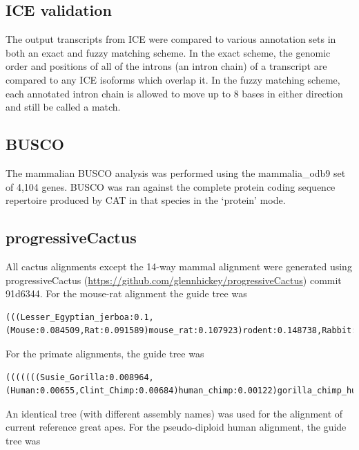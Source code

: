 \documentclass[fleqn,10pt]{wlscirep}
\begin{document}
\subsection*{ICE validation}
The output transcripts from ICE were compared to various annotation sets in both an exact and fuzzy matching scheme. In the exact scheme, the genomic order and positions of all of the introns (an intron chain) of a transcript are compared to any ICE isoforms which overlap it. In the fuzzy matching scheme, each annotated intron chain is allowed to move up to 8 bases in either direction and still be called a match.

\subsection*{BUSCO}
The mammalian BUSCO analysis was performed using the mammalia\_odb9 set of 4,104 genes. BUSCO was ran against the complete protein coding sequence repertoire produced by CAT in that species in the `protein' mode.

\subsection*{progressiveCactus}
	All cactus alignments except the 14-way mammal alignment were generated using progressiveCactus (\url{https://github.com/glennhickey/progressiveCactus}) commit 91d6344. For the mouse-rat alignment the guide tree was 

\begin{lstlisting}
(((Lesser_Egyptian_jerboa:0.1,(Mouse:0.084509,Rat:0.091589)mouse_rat:0.107923)rodent:0.148738,Rabbit:0.21569)glires:0.015313,Human:0.143908);
\end{lstlisting}
    
For the primate alignments, the guide tree was 
    
\begin{lstlisting}
(((((((Susie_Gorilla:0.008964,(Human:0.00655,Clint_Chimp:0.00684)human_chimp:0.00122)gorilla_chimp_human:0.009693,Susie_Orangutan:0.01894)great_ape:0.003471,Gibbon:0.02227)great_ape_gibbon:0.01204,Rhesus:0.004991)old_world_monkey:0.02183,Squirrel_monkey:0.01035)monkey:0.05209,Bushbaby:0.1194)primate_anc:0.013494,Mouse:0.084509);
\end{lstlisting}
    
An identical tree (with different assembly names) was used for the alignment of current reference great apes. For the pseudo-diploid human alignment, the guide tree was 
    
\end{document}

